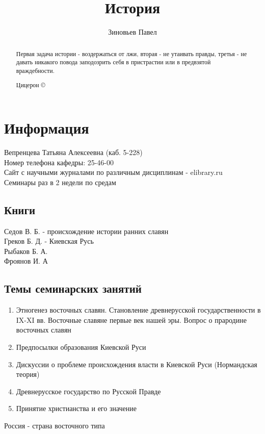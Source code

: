 \documentclass[a4paper, 11pt, oneside]{article}
\title{История}
\author{Зиновьев Павел}
\begin{document}
\maketitle
\begin{abstract}
	Первая задача истории - воздержаться от лжи, вторая - не утаивать правды, третья - не давать никакого повода 
	заподозрить себя в пристрастии или в предвзятой враждебности.
	\begin{flushright}
		 Цицерон \copyright
	\end{flushright}
\end{abstract}
\newpage
\tableofcontents
\contentsname
\newpage

\section{Информация}
Вепренцева Татьяна Алексеевна (каб. 5-228)\\
Номер телефона кафедры: 25-46-00\\
Сайт с научными журналами по различным дисциплинам - elibrary.ru\\
Семинары раз в 2 недели по средам
\subsection{Книги}
Седов В. Б. - происхождение истории ранних славян\\
Греков Б. Д. - Киевская Русь\\
Рыбаков Б. А.\\
Фроянов И. А


\subsection{Темы семинарских занятий}

\begin{enumerate}
\item Этногенез восточных славян. Становление древнерусской государственности в IX-XI вв. Восточные славяне первые век нашей эры. Вопрос о прародине восточных славян
\item Предпосылки образования Киевской Руси
\item Дискуссии о проблеме происхождения власти в Киевской Руси (Нормандская теория)
\item Древнерусское государство по Русской Правде
\item Принятие христианства и его значение
\end{enumerate}

Россия - страна восточного типа
\end{document}
